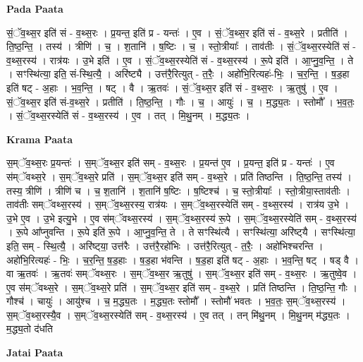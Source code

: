 \documentclass[17pt]{extarticle}
\begin{document}
\textbf{Pada Paata} \newline

सं॒ॅव॒थ्स॒र इति॑ सं - व॒थ्स॒रः । प्र॒यन्त॒ इति॑ प्र - यन्तः॑ । ए॒व । सं॒ॅव॒थ्स॒र इति॑ सं - व॒थ्स॒रे । प्रतीति॑ । ति॒ष्ठ॒न्ति॒ । तस्य॑ । त्रीणि॑ । च॒ । श॒तानि॑ । ष॒ष्टिः । च॒ । स्तो॒त्रीयाः᳚ । ताव॑तीः । सं॒ॅव॒थ्स॒रस्येति॑ सं - व॒थ्स॒रस्य॑ । रात्र॑यः । उ॒भे इति॑ । ए॒व । सं॒ॅव॒थ्स॒रस्येति॑ सं - व॒थ्स॒रस्य॑ । रू॒पे इति॑ । आ॒प्नु॒व॒न्ति॒ । ते । सꣳस्थि॑त्या॒ इति॒ सं-स्थि॒त्यै॒ । अरि॑ष्ट्यै । उत्त॑रै॒रित्युत् - त॒रैः॒ । अहो॑भि॒रित्यहः॑-भिः॒ । च॒र॒न्ति॒ । ष॒ड॒हा इति॑ षट् - अ॒हाः । भ॒व॒न्ति॒ । षट् । वै । ऋ॒तवः॑ । सं॒ॅव॒थ्स॒र इति॑ सं - व॒थ्स॒रः । ऋ॒तुषु॑ । ए॒व । सं॒ॅव॒थ्स॒र इति॑ सं-व॒थ्स॒रे । प्रतीति॑ । ति॒ष्ठ॒न्ति॒ । गौः । च॒ । आयुः॑ । च॒ । म॒द्ध्य॒तः । स्तोमौ᳚ । भ॒व॒तः॒ । सं॒ॅव॒थ्स॒रस्येति॑ सं - व॒थ्स॒रस्य॑ । ए॒व । तत् । मि॒थु॒नम् । म॒द्ध्य॒तः ।  \newline


\textbf{Krama Paata} \newline

स॒म्ॅव॒थ्स॒रः प्र॒यन्तः॑ । स॒म्ॅव॒थ्स॒र इति॑ सम् - व॒थ्स॒रः । प्र॒यन्त॑ ए॒व । प्र॒यन्त॒ इति॑ प्र - यन्तः॑ । ए॒व स॑म्ॅवथ्स॒रे । स॒म्ॅव॒थ्स॒रे प्रति॑ । स॒म्ॅव॒थ्स॒र इति॑ सम् - व॒थ्स॒रे । प्रति॑ तिष्ठन्ति । ति॒ष्ठ॒न्ति॒ तस्य॑ । तस्य॒ त्रीणि॑ । त्रीणि॑ च । च॒ श॒तानि॑ । श॒तानि॑ ष॒ष्टिः । ष॒ष्टिश्च॑ । च॒ स्तो॒त्रीयाः᳚ । स्तो॒त्रीया॒स्ताव॑तीः । ताव॑तीः सम्ॅवथ्स॒रस्य॑ । स॒म्ॅव॒थ्स॒रस्य॒ रात्र॑यः । स॒म्ॅव॒थ्स॒रस्येति॑ सम् - व॒थ्स॒रस्य॑ । रात्र॑य उ॒भे । उ॒भे ए॒व । उ॒भे इत्यु॒भे । ए॒व स॑म्ॅवथ्स॒रस्य॑ । स॒म्ॅव॒थ्स॒रस्य॑ रू॒पे । स॒म्ॅव॒थ्स॒रस्येति॑ सम् - व॒थ्स॒रस्य॑ । रू॒पे आ᳚प्नुवन्ति । रू॒पे इति॑ रू॒पे । आ॒प्नु॒व॒न्ति॒ ते । ते सꣳस्थि॑त्यै । सꣳस्थि॑त्या॒ अरि॑ष्ट्‍यै । सꣳस्थि॑त्या॒ इति॒ सम् - स्थि॒त्यै॒ । अरि॑ष्ट्‍या॒ उत्त॑रैः । उत्त॑रै॒रहो॑भिः । उत्त॑रै॒रित्युत् - त॒रैः॒ । अहो॑भिश्चरन्ति । अहो॑भि॒रित्यहः॑ - भिः॒ । च॒र॒न्ति॒ ष॒ड॒हाः । ष॒ड॒हा भ॑वन्ति । ष॒ड॒हा इति॑ षट् - अ॒हाः । भ॒व॒न्ति॒ षट् । षड् वै । वा ऋ॒तवः॑ । ऋ॒तवः॑ सम्ॅवथ्स॒रः । स॒म्ॅव॒थ्स॒र ऋ॒तुषु॑ । स॒म्ॅव॒थ्स॒र इति॑ सम् - व॒थ्स॒रः । ऋ॒तुष्वे॒व । ए॒व स॑म्ॅवथ्स॒रे । स॒म्ॅव॒थ्स॒रे प्रति॑ । स॒म्ॅव॒थ्स॒र इति॑ सम् - व॒थ्स॒रे । प्रति॑ तिष्ठन्ति । ति॒ष्ठ॒न्ति॒ गौः । गौश्च॑ । चायुः॑ । आयु॑श्च । च॒ म॒द्ध्य॒तः । म॒द्ध्य॒तः स्तोमौ᳚ । स्तोमौ॑ भवतः । भ॒व॒तः॒ स॒म्ॅव॒थ्स॒रस्य॑ । स॒म्ॅव॒थ्स॒रस्यै॒व । स॒म्ॅव॒थ्स॒रस्येति॑ सम् - व॒थ्स॒रस्य॑ । ए॒व तत् । तन् मि॑थु॒नम् । मि॒थु॒नम् म॑द्ध्य॒तः । म॒द्ध्य॒तो द॑धति \newline

\textbf{Jatai Paata} \newline
\end{document}
